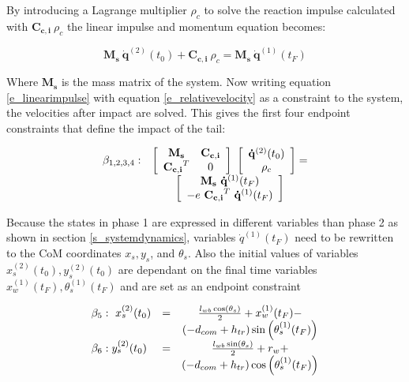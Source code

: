 \documentclass[default,iicol]{sn-jnl}
\theoremstyle{thmstyleone}%
\theoremstyle{thmstyletwo}%
\theoremstyle{thmstylethree}%
\begin{document}
By introducing a Lagrange multiplier $\rho_c$ to solve the reaction impulse calculated with $\mathbf{C_{c,i}}\ \rho_c$ the linear impulse and momentum equation becomes:

\begin{equation}\label{e_linearimpulse}
    \mathbf{M_s}\ \mathbf{\dot q}^{(2)}(t_0) + \mathbf{C_{c,i}}\ \rho_c = \mathbf{M_s}\ \mathbf{\dot q}^{(1)}(t_F)
\end{equation}

Where $\mathbf{M_s}$ is the mass matrix of the system. Now writing equation \ref{e_linearimpulse} with equation \ref{e_relativevelocity} as a constraint to the system, the velocities after impact are solved. This gives the first four endpoint constraints that define the impact of the tail:

\begin{equation}
\begin{array}{l c}
    \beta_{1,2,3,4}: & \left[\begin{array}{cc}
        \mathbf{M_s} & \mathbf{C_{c,i}} \\
        \mathbf{C_{c,i}}^T & 0
    \end{array} \right]\
    \left[\begin{array}{c}
       \mathbf{\dot q}^{(2)}(t_0)  \\
        \rho_c 
    \end{array}\right] =
     \\ &  
     \left[\begin{array}{c}
         \mathbf{M_s}\ \mathbf{\dot q}^{(1)}(t_F)   \\
         -e\ \mathbf{C_{c,i}}^T\ \mathbf{\dot q}^{(1)}(t_F)
    \end{array}\right]
    \end{array}
\end{equation}

Because the states in phase 1 are expressed in different variables than phase 2 as shown in section \ref{s_systemdynamics}, variables $\dot q^{(1)}(t_F)$ need to be rewritten to the CoM coordinates $x_s,y_s$, and $\theta_s$. Also the initial values of variables $x_s^{(2)}(t_0), y_s^{(2)}(t_0)$ are dependant on the final time variables $x_w^{(1)}(t_F), \theta_s^{(1)}(t_F)$ and are set as an endpoint constraint

\begin{equation}
\begin{array}{l c c}
\beta_5: \ x_s^{(2)}(t_0) & = & \frac{l_{w b} \cos \left(\theta_s\right)}{2}+x_w^{(1)}(t_F)- \\ 
& & \left(-d_{c o m}+h_{t r}\right) \sin \left(\theta_s^{(1)}(t_F)\right) \\

\beta_6: y_s^{(2)}(t_0) & = & \frac{l_{w b} \sin \left(\theta_s\right)}{2}+r_w+ \\ 
& & \left(-d_{c o m}+h_{t r}\right) \cos \left(\theta_s^{(1)}(t_F)\right)
\end{array}
\end{equation}
\end{document}
